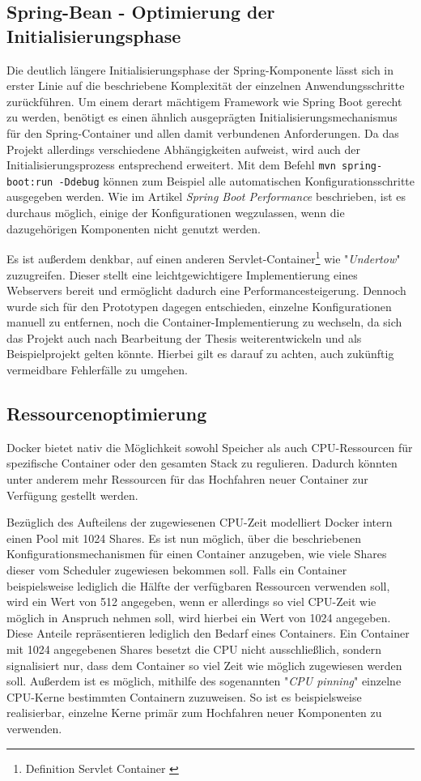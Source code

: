 \subsection{Spring-Bean - Optimierung der Initialisierungsphase}
\label{ss:spring-perf}

Die deutlich längere Initialisierungsphase der Spring-Komponente lässt sich in erster Linie auf die beschriebene Komplexität der einzelnen Anwendungsschritte zurückführen. Um einem derart mächtigem Framework wie Spring Boot gerecht zu werden, benötigt es einen ähnlich ausgeprägten Initialisierungsmechanismus für den Spring-Container und allen damit verbundenen Anforderungen. Da das Projekt allerdings verschiedene Abhängigkeiten aufweist, wird auch der Initialisierungsprozess entsprechend erweitert. Mit dem Befehl \verb+mvn spring-boot:run -Ddebug+ können zum Beispiel alle automatischen Konfigurationsschritte ausgegeben werden. Wie im Artikel \emph{Spring Boot Performance}\cite{spring-perf} beschrieben, ist es durchaus möglich, einige der Konfigurationen wegzulassen, wenn die dazugehörigen Komponenten nicht genutzt werden. 

Es ist außerdem denkbar, auf einen anderen Servlet-Container\footnote{Definition Servlet Container \cite{servlet-container-def}} wie "\emph{Undertow}" zuzugreifen. Dieser stellt eine leichtgewichtigere Implementierung eines Webservers bereit und ermöglicht dadurch eine Performancesteigerung. Dennoch wurde sich für den Prototypen dagegen entschieden, einzelne Konfigurationen manuell zu entfernen, noch die Container-Implementierung zu wechseln, da sich das Projekt auch nach Bearbeitung der Thesis weiterentwickeln und als Beispielprojekt gelten könnte. Hierbei gilt es darauf zu achten, auch zukünftig vermeidbare Fehlerfälle zu umgehen.


\subsection{Ressourcenoptimierung}
\label{par:resOpt}
Docker bietet nativ die Möglichkeit sowohl Speicher als auch CPU-Ressourcen für spezifische Container oder den gesamten Stack zu regulieren. Dadurch könnten unter anderem mehr Ressourcen für das Hochfahren neuer Container zur Verfügung gestellt werden.

Bezüglich des Aufteilens der zugewiesenen CPU-Zeit modelliert Docker intern einen Pool mit 1024 Shares. Es ist nun möglich, über die beschriebenen Konfigurationsmechanismen für einen Container anzugeben, wie viele Shares dieser vom Scheduler zugewiesen bekommen soll. Falls ein Container beispielsweise lediglich die Hälfte der verfügbaren Ressourcen verwenden soll, wird ein Wert von 512 angegeben, wenn er allerdings so viel CPU-Zeit wie möglich in Anspruch nehmen soll, wird hierbei ein Wert von 1024 angegeben. Diese Anteile repräsentieren lediglich den Bedarf eines Containers. Ein Container mit 1024 angegebenen Shares besetzt die CPU nicht ausschließlich, sondern signalisiert nur, dass dem Container so viel Zeit wie möglich zugewiesen werden soll. Außerdem ist es möglich, mithilfe des sogenannten "\emph{CPU pinning}" einzelne CPU-Kerne bestimmten Containern zuzuweisen. So ist es beispielsweise realisierbar, einzelne Kerne primär zum Hochfahren neuer Komponenten zu verwenden. 

